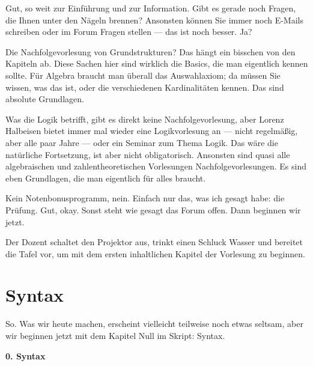 \begin{spoken-clean}[00:30:30 - 00:31:29]
Gut, so weit zur Einführung und zur Information. Gibt es gerade noch Fragen, die Ihnen unter den Nägeln brennen? Ansonsten können Sie immer noch E-Mails schreiben oder im Forum Fragen stellen --- das ist noch besser. Ja?


Die Nachfolgevorlesung von Grundstrukturen? Das hängt ein bisschen von den Kapiteln ab. Diese Sachen hier sind wirklich die Basics, die man eigentlich kennen sollte. Für Algebra braucht man überall das Auswahlaxiom; da müssen Sie wissen, was das ist, oder die verschiedenen Kardinalitäten kennen. Das sind absolute Grundlagen. 

Was die Logik betrifft, gibt es direkt keine Nachfolgevorlesung, aber Lorenz Halbeisen bietet immer mal wieder eine Logikvorlesung an --- nicht regelmäßig, aber alle paar Jahre --- oder ein Seminar zum Thema Logik. Das wäre die natürliche Fortsetzung, ist aber nicht obligatorisch. Ansonsten sind quasi alle algebraischen und zahlentheoretischen Vorlesungen Nachfolgevorlesungen. Es sind eben Grundlagen, die man eigentlich für alles braucht.

Kein Notenbonusprogramm, nein. Einfach nur das, was ich gesagt habe: die Prüfung. Gut, okay. Sonst steht wie gesagt das Forum offen. Dann beginnen wir jetzt.
\end{spoken-clean}

\begin{meta-note}[Tafelübergang]
Der Dozent schaltet den Projektor aus, trinkt einen Schluck Wasser und bereitet die Tafel vor, um mit dem ersten inhaltlichen Kapitel der Vorlesung zu beginnen.
\end{meta-note}

\section{Syntax}

\begin{spoken-clean}[00:31:29 - 00:31:45]
So. Was wir heute machen, erscheint vielleicht teilweise noch etwas seltsam, aber wir beginnen jetzt mit dem Kapitel Null im Skript: Syntax.
\end{spoken-clean}

\begin{math-stroke}
\textbf{0. Syntax}
\end{math-stroke}

